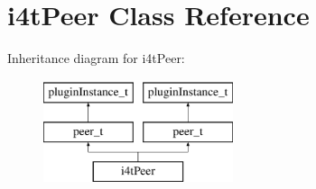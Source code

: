 \hypertarget{classi4tPeer}{\section{i4t\-Peer \-Class \-Reference}
\label{classi4tPeer}
}
\-Inheritance diagram for i4t\-Peer\-:\begin{figure}[H]
\begin{center}
\leavevmode
\includegraphics[height=3.000000cm]{classi4tPeer}
\end{center}
\end{figure}

